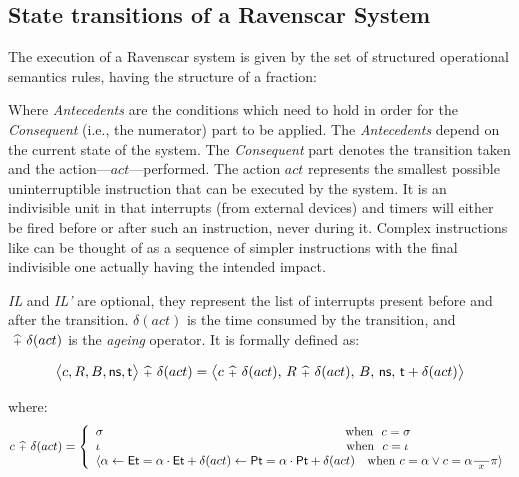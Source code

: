  
\subsection{State transitions of a Ravenscar System}
The execution of a Ravenscar system is given by the set of structured
operational semantics rules, having the structure of a fraction:

\begin{center}
\end{center}

Where \emph{Antecedents} are the conditions which need to hold in
order for the \emph{Consequent} (i.e., the numerator) part to be
applied. The \emph{Antecedents} depend on the current state of the
system. The \emph{Consequent} part denotes the transition taken and
the action---$act$---performed. The action $act$ represents the
smallest possible uninterruptible instruction that can be executed by
the system. It is an indivisible unit in that interrupts (from
external devices) and timers will either be fired before or after such
an instruction, never during it. Complex instructions like  can be thought of as a sequence of simpler instructions with
the final indivisible one actually having the intended impact.

\textit{IL} and \textit{IL'} are optional, they represent the list of
interrupts present before and after the transition. $\delta(act)$ is
the time consumed by the transition, and $\ {\scriptstyle {\widehat{+}}}\ \delta(act)$ is the
\emph{ageing} operator. It is formally defined as:

\begin{displaymath}
  \big\langle c,R,B,\text{\sffamily ns},\text{\sffamily t} \big\rangle 
\ {\scriptstyle {\widehat{+}}}\  \delta (act) = 
\big\langle c \ {\scriptstyle {\widehat{+}}}\  \delta (act), \, R \ {\scriptstyle {\widehat{+}}}\  \delta (act), \,
B, \, \text{\sffamily ns}, \, \text{\sffamily t}+\delta (act)\big\rangle
\end{displaymath}

\noindent
where:
\begin{equation} 
\nonumber
  c\sqplus\delta (act) = \left \{
    \begin{array}{l}
      \sigma\qquad\qquad\qquad\qquad\qquad\qquad\qquad\quad\quad\quad\quad\quad\ \ \text{when}
      \ \ c=\sigma \\
      \iota
      \qquad\qquad\qquad\qquad\qquad\qquad\qquad\quad\quad\quad\quad\quad\ \ \ \text{when}\ \ c=\iota
      \\
      \langle\alpha\gets\SFT{Et}=\alpha\cdot\SFT{Et}+\delta (act)
      \gets\SFT{Pt}=\alpha\cdot\SFT{Pt}+\delta (act)\ \ \ \text{when}
      \  c=\alpha\vee c=\alpha\rx\pi\rangle     
    \end{array} 
    \right.
\end{equation}

